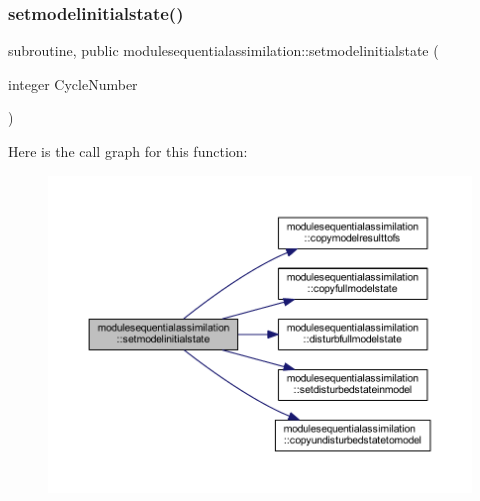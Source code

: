 \subsubsection{\texorpdfstring{setmodelinitialstate()}{setmodelinitialstate()}}
{\footnotesize\ttfamily subroutine, public modulesequentialassimilation\+::setmodelinitialstate (\begin{DoxyParamCaption}\item[{integer}]{Cycle\+Number }\end{DoxyParamCaption})}

Here is the call graph for this function\+:\nopagebreak
\begin{figure}[H]
\begin{center}
\leavevmode
\includegraphics[width=350pt]{namespacemodulesequentialassimilation_a0b54df1b07a9718187dcc6448f23026c_cgraph}
\end{center}
\end{figure}
\mbox{\label{namespacemodulesequentialassimilation_af7b9f893222a8a590e41b22e1cbb87e8}} 
